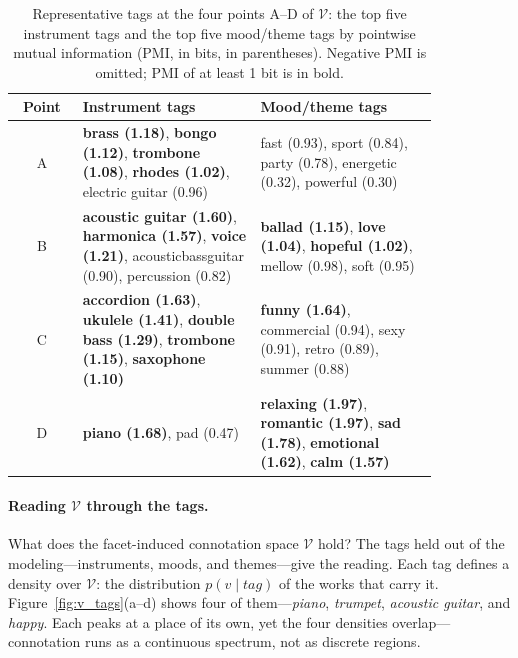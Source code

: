 \begin{table}[t]
    \centering\small
    \caption{Representative tags at the four points A--D of
        $\mathcal{V}$: the top five instrument tags and the top five
        mood/theme tags by pointwise mutual information (PMI, in bits,
        in parentheses). Negative PMI is omitted; PMI of at least 1 bit
        is in bold.}
    \label{tab:point_tags}
    \begin{tabular}{@{}c p{0.42\linewidth} p{0.42\linewidth}@{}}
        \toprule
        \textbf{Point} & \textbf{Instrument tags}                               &
        \textbf{Mood/theme tags}                                                  \\
        \midrule
        A              & \textbf{brass (1.18)}, \textbf{bongo (1.12)},
        \textbf{trombone (1.08)}, \textbf{rhodes (1.02)},
        electric guitar (0.96)
                       & fast (0.93), sport (0.84), party (0.78),
        energetic (0.32), powerful (0.30)                                         \\
        \addlinespace
        B              & \textbf{acoustic guitar (1.60)},
        \textbf{harmonica (1.57)}, \textbf{voice (1.21)},
        acousticbassguitar (0.90), percussion (0.82)
                       & \textbf{ballad (1.15)}, \textbf{love (1.04)},
        \textbf{hopeful (1.02)}, mellow (0.98), soft (0.95)                       \\
        \addlinespace
        C              & \textbf{accordion (1.63)}, \textbf{ukulele (1.41)},
        \textbf{double bass (1.29)}, \textbf{trombone (1.15)},
        \textbf{saxophone (1.10)}
                       & \textbf{funny (1.64)}, commercial (0.94), sexy (0.91),
        retro (0.89), summer (0.88)                                               \\
        \addlinespace
        D              & \textbf{piano (1.68)}, pad (0.47)
                       & \textbf{relaxing (1.97)}, \textbf{romantic (1.97)},
        \textbf{sad (1.78)}, \textbf{emotional (1.62)},
        \textbf{calm (1.57)}                                                      \\
        \bottomrule
    \end{tabular}
\end{table}

\paragraph{Reading $\mathcal{V}$ through the tags.} What does the facet-induced
connotation space $\mathcal{V}$ hold? The tags held out of the
modeling---instruments, moods, and themes---give the reading. Each tag defines a
density over $\mathcal{V}$: the distribution $p(v \mid \textit{tag})$ of the
works that carry it. Figure~\ref{fig:v_tags}(a--d) shows four of
them---\textit{piano}, \textit{trumpet}, \textit{acoustic guitar}, and
\textit{happy}. Each peaks at a place of its own, yet the four densities
overlap---connotation runs as a continuous spectrum, not as discrete regions.

